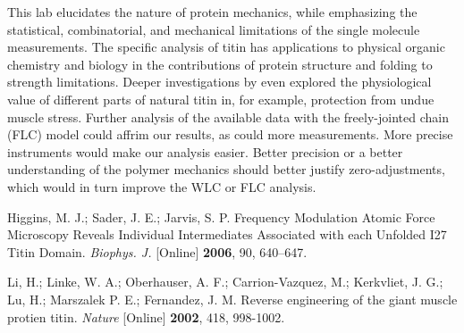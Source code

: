 \documentclass{article}
\begin{document}
This lab elucidates the nature of protein mechanics, while emphasizing the statistical, 
combinatorial, and mechanical limitations of the single molecule measurements. The
specific analysis of titin has applications to physical organic chemistry and biology
in the contributions of protein structure and folding to strength limitations. Deeper
investigations by \cite{nature} even explored the physiological value of different parts
of natural titin in, for example, protection from undue muscle stress. Further analysis of the
available data with the freely-jointed chain (FLC) model could affrim our results, as could
more measurements. More precise instruments would make our analysis easier. Better
precision or a better understanding of the polymer mechanics should better justify
zero-adjustments, which would in turn improve the WLC or FLC analysis. 

\begin{thebibliography}{9}

Higgins, M. J.; Sader, J. E.; Jarvis, S. P. Frequency Modulation Atomic Force Microscopy 
Reveals Individual Intermediates Associated with each Unfolded I27 Titin Domain. 
\textit{Biophys. J.} [Online] \textbf{2006}, 90, 640–647.

Li, H.; Linke, W. A.; Oberhauser, A. F.; Carrion-Vazquez, M.;
Kerkvliet, J. G.; Lu, H.; Marszalek P. E.; Fernandez, J. M. Reverse engineering of the giant
muscle protien titin.  \textit{Nature} [Online] \textbf{2002}, 418, 998-1002.

\end{thebibliography}
\end{document}
